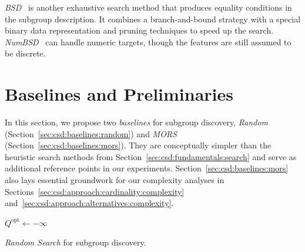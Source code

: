 \documentclass[acmsmall]{acmart} %
\theoremstyle{acmplain}
\theoremstyle{acmdefinition}
\begin{document}
\emph{BSD}~\cite{lemmerich2010fast} is another exhaustive search method that produces equality conditions in the subgroup description.
It combines a branch-and-bound strategy with a special binary data representation and pruning techniques to speed up the search.
\emph{NumBSD}~\cite{lemmerich2016fast} can handle numeric targets, though the features are still assumed to be discrete.

\section{Baselines and Preliminaries}
\label{sec:csd:baselines}

In this section, we propose two \emph{baselines} for subgroup discovery, \emph{Random} (Section~\ref{sec:csd:baselines:random}) and \emph{MORS} (Section~\ref{sec:csd:baselines:mors}).
They are conceptually simpler than the heuristic search methods from Section~\ref{sec:csd:fundamentals:search} and serve as additional reference points in our experiments.
Section~\ref{sec:csd:baselines:mors} also lays essential groundwork for our complexity analyses in Sections~\ref{sec:csd:approach:cardinality:complexity} and~\ref{sec:csd:approach:alternatives:complexity}.

\begin{algorithm}[t]
	\DontPrintSemicolon
	\BlankLine
	$Q^{\text{opt}} \leftarrow - \infty$\;
	\caption{\emph{Random Search} for subgroup discovery.}
	\label{al:csd:random-search}
\end{algorithm}
\end{document}
